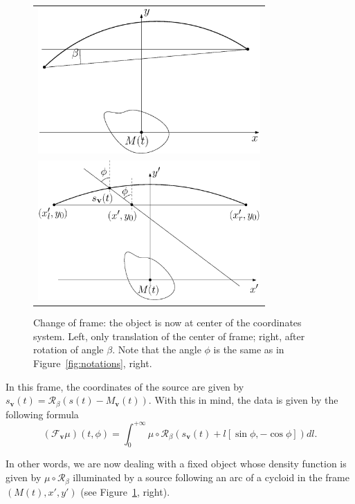 \documentclass[9pt,technote]{IEEEtran}
\numberwithin{equation}{section}
\newcommand{\bv}{\mathbf{v}}
\newcommand{\Mbv}{M_{\mathbf{v}}}
\newcommand{\Tbv}{\mathcal{F}_{\mathbf{v}}}
\newcommand{\sbv}{s_{\mathbf{v}}}
\begin{document}
\begin{figure}[!ht]
	\centering
	\begin{tabular}{c}
	\includegraphics[width=85mm]{figs/frame_object_before_rotation.eps} \\
	\includegraphics[width=85mm]{figs/frame_object.eps}
	\end{tabular}
	\caption{Change of frame: the object is now at center of the coordinates system. Left, only translation of the center of frame; right, after rotation of angle $\beta$. Note that the angle $\phi$ is the same as in Figure~\ref{fig:notations}, right.\label{fig:change_frame}}
\end{figure}

In this frame, the coordinates of the source are given by $\sbv(t)=\mathcal{R}_{\beta} \left( s(t)-\Mbv(t) \right)$. With this in mind, the data is given by the following formula
\begin{equation}
	(\Tbv\mu)(t,\phi) = \int_0^{+\infty} \mu \circ \mathcal{R}_{\beta} \left( s_{\bv}(t) + l \left[ \sin \phi, -\cos \phi \right] \right) dl.
\label{eq:F_from_sv}
\end{equation}

In other words, we are now dealing with a fixed object whose density function is given by $\mu \circ \mathcal{R}_{\beta}$ illuminated by a source following an arc of a cycloid in the frame $\left(M(t), x', y'\right)$ (see Figure~\ref{fig:change_frame}, right).
\end{document}
